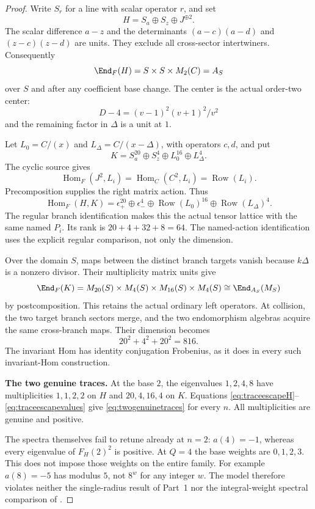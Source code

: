 \begin{proof}
Write $S_r$ for a line with scalar operator $r$, and set
\[
 H=S_a\oplus S_z\oplus J^{\oplus2}.
\]
The scalar difference $a-z$ and the determinants
$(a-c)(a-d)$ and $(z-c)(z-d)$ are units.
They exclude all cross-sector intertwiners.
Consequently
\begin{equation}\label{eq:traceescapefullcentralizer}
 \End_F(H)=S\times S\times M_2(C)=A_S
\end{equation}
over $S$ and after any coefficient base change.
The center is the actual order-two center:
\[
 D-4=(v-1)^2(v+1)^2/v^2
\]
and the remaining factor in $\Delta$ is a unit at $1$.

Let $L_0=C/(x)$ and $L_\Delta=C/(x-\Delta)$, with
operators $c,d$, and put
\[
 K=S_a^{20}\oplus S_z^4\oplus L_0^{16}\oplus L_\Delta^4.
\]
The cyclic source gives
\[
 \operatorname{Hom}_F(J^2,L_i)
       =\operatorname{Hom}_C(C^2,L_i)
       =\operatorname{Row}(L_i).
\]
Precomposition supplies the right matrix action.
Thus
\[
 \operatorname{Hom}_F(H,K)=
 \epsilon_+^{20}\oplus\epsilon_-^4
 \oplus\operatorname{Row}(L_0)^{16}
 \oplus\operatorname{Row}(L_\Delta)^4.
\]
The regular  branch identification makes this
the actual tensor lattice with the same named $P_i$.
Its rank is $20+4+32+8=64$.
The named-action identification uses the explicit regular
comparison, not only the dimension.

Over the domain $S$, maps between the distinct branch
targets vanish because $k\Delta$ is a nonzero divisor.
Their multiplicity matrix units give
\[
 \End_F(K)=M_{20}(S)\times M_4(S)\times
          M_{16}(S)\times M_4(S)
          \cong\End_{A_S}(M_S)
\]
by postcomposition.
This retains the actual ordinary left operators.
At collision, the two target branch sectors merge,
and the two endomorphism algebras acquire the same
cross-branch maps. Their dimension becomes
\[
 20^2+4^2+20^2=816.
\]
The invariant Hom has identity conjugation Frobenius,
as it does in every such invariant-Hom construction.

\par\smallskip\noindent\textbf{The two genuine traces.}\quad
At the base $2$, the eigenvalues $1,2,4,8$ have
multiplicities $1,1,2,2$ on $H$ and $20,4,16,4$ on $K$.
Equations \eqref{eq:traceescapeH}--\eqref{eq:traceescapevalues}
give \eqref{eq:twogenuinetraces} for every $n$.
All multiplicities are genuine and positive.

The spectra themselves fail to retune already at $n=2$:
$a(4)=-1$, whereas every eigenvalue of $F_H(2)^2$ is
positive.
At $Q=4$ the base weights are $0,1,2,3$.
This does not impose those weights on the entire family.
For example $a(8)=-5$ has modulus $5$, not $8^w$ for
any integer $w$.
The model therefore violates neither the single-radius
result of Part~1 nor the integral-weight spectral
comparison of .
\end{proof}

